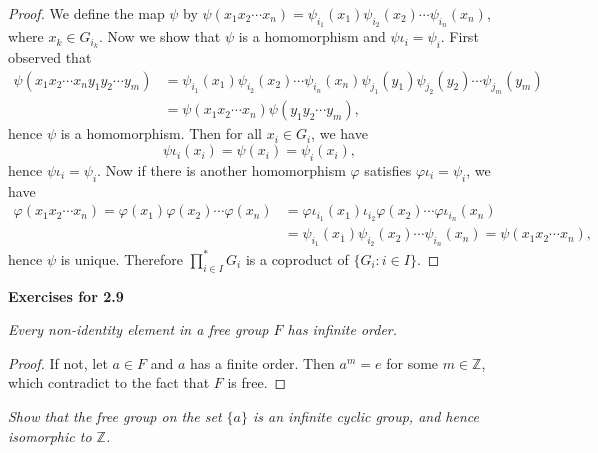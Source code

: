\begin{proof}
We define the map $\psi$ by $\psi(x_1x_2\cdots x_n)=\psi_{i_1}(x_1)\psi_{i_2}(x_2)\cdots\psi_{i_n}(x_n)$, where $x_k\in G_{i_k}$. Now we show that $\psi$ is a homomorphism and $\psi\iota_i=\psi_i$. First observed that 
$$
\begin{aligned}
\psi \left( x_1x_2\cdots x_ny_1y_2\cdots y_m \right) &=\psi _{i_1}\left( x_1 \right) \psi _{i_2}\left( x_2 \right) \cdots \psi _{i_n}\left( x_n \right) \psi _{j_1}\left( y_1 \right) \psi _{j_2}\left( y_2 \right) \cdots \psi _{j_m}\left( y_m \right) \\
&=\psi \left( x_1x_2\cdots x_n \right) \psi \left( y_1y_2\cdots y_m \right) ,
\end{aligned}
$$
hence $\psi$ is a homomorphism. Then for all $x_i\in G_i$, we have 
$$
\psi \iota _i\left( x_i \right) =\psi \left( x_i \right) =\psi _i\left( x_i \right) ,
$$
hence $\psi\iota_i=\psi_i$. Now if there is another homomorphism $\varphi$ satisfies $\varphi\iota_i=\psi_i$, we have 
$$
\begin{aligned}
\varphi \left( x_1x_2\cdots x_n \right) =\varphi \left( x_1 \right) \varphi \left( x_2 \right) \cdots \varphi \left( x_n \right) &=\varphi \iota _{i_1}\left( x_1 \right) \iota _{i_2}\varphi \left( x_2 \right) \cdots \varphi \iota _{i_n}\left( x_n \right) \\
&=\psi _{i_1}\left( x_1 \right) \psi _{i_2}\left( x_2 \right) \cdots \psi _{i_n}\left( x_n \right) =\psi \left( x_1x_2\cdots x_n \right) ,
\end{aligned}
$$
hence $\psi$ is unique. Therefore ${\prod}^*_{i\in I}G_i$ is a coproduct of $\{G_i:i\in I\}$.
\end{proof}
\begin{center}
\begin{large}
    \textbf{Exercises for 2.9}
\end{large}
\end{center}
\begin{problem}\em
Every non-identity element in a free group $F$ has infinite order.
\end{problem}
\begin{proof}
If not, let $a\in F$ and $a$ has a finite order. Then $a^m=e$ for some $m\in\mathbb{Z}$, which contradict to the fact that $F$ is free.
\end{proof}
\begin{problem}\em
Show that the free group on the set $\{a\}$ is an infinite cyclic group, and hence isomorphic to $\mathbb{Z}$.
\end{problem}
